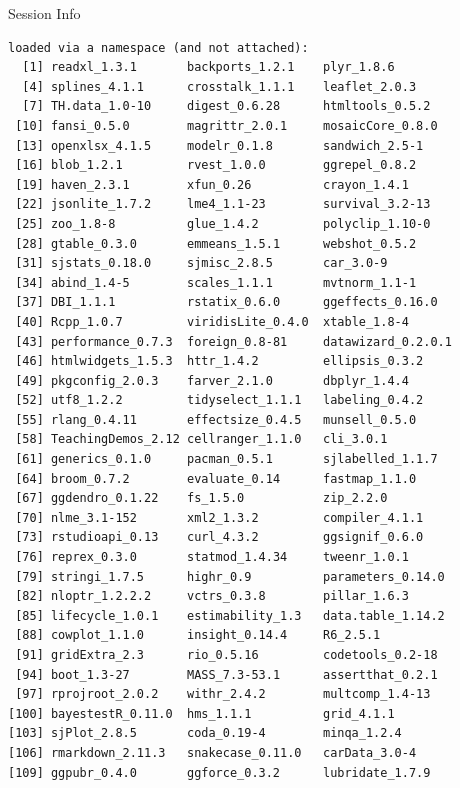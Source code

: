 \documentclass[10pt]{beamer}\usepackage[]{graphicx}\usepackage[]{color}
\makeatletter
\newenvironment{kframe}{%
 \def\at@end@of@kframe{}%
 \ifinner\ifhmode%
  \def\at@end@of@kframe{\end{minipage}}%
  \begin{minipage}{\columnwidth}%
 \fi\fi%
 \def\FrameCommand##1{\hskip\@totalleftmargin \hskip-\fboxsep
 \colorbox{shadecolor}{##1}\hskip-\fboxsep
     \hskip-\linewidth \hskip-\@totalleftmargin \hskip\columnwidth}%
 \MakeFramed {\advance\hsize-\width
   \@totalleftmargin\z@ \linewidth\hsize
   \@setminipage}}%
 {\par\unskip\endMakeFramed%
 \at@end@of@kframe}
\newenvironment{knitrout}{}{} %
\makeatother
\begin{document}
\begin{frame}[fragile]{Session Info}
\begin{knitrout}
\begin{kframe}
\begin{verbatim}
loaded via a namespace (and not attached):
  [1] readxl_1.3.1       backports_1.2.1    plyr_1.8.6        
  [4] splines_4.1.1      crosstalk_1.1.1    leaflet_2.0.3     
  [7] TH.data_1.0-10     digest_0.6.28      htmltools_0.5.2   
 [10] fansi_0.5.0        magrittr_2.0.1     mosaicCore_0.8.0  
 [13] openxlsx_4.1.5     modelr_0.1.8       sandwich_2.5-1    
 [16] blob_1.2.1         rvest_1.0.0        ggrepel_0.8.2     
 [19] haven_2.3.1        xfun_0.26          crayon_1.4.1      
 [22] jsonlite_1.7.2     lme4_1.1-23        survival_3.2-13   
 [25] zoo_1.8-8          glue_1.4.2         polyclip_1.10-0   
 [28] gtable_0.3.0       emmeans_1.5.1      webshot_0.5.2     
 [31] sjstats_0.18.0     sjmisc_2.8.5       car_3.0-9         
 [34] abind_1.4-5        scales_1.1.1       mvtnorm_1.1-1     
 [37] DBI_1.1.1          rstatix_0.6.0      ggeffects_0.16.0  
 [40] Rcpp_1.0.7         viridisLite_0.4.0  xtable_1.8-4      
 [43] performance_0.7.3  foreign_0.8-81     datawizard_0.2.0.1
 [46] htmlwidgets_1.5.3  httr_1.4.2         ellipsis_0.3.2    
 [49] pkgconfig_2.0.3    farver_2.1.0       dbplyr_1.4.4      
 [52] utf8_1.2.2         tidyselect_1.1.1   labeling_0.4.2    
 [55] rlang_0.4.11       effectsize_0.4.5   munsell_0.5.0     
 [58] TeachingDemos_2.12 cellranger_1.1.0   cli_3.0.1         
 [61] generics_0.1.0     pacman_0.5.1       sjlabelled_1.1.7  
 [64] broom_0.7.2        evaluate_0.14      fastmap_1.1.0     
 [67] ggdendro_0.1.22    fs_1.5.0           zip_2.2.0         
 [70] nlme_3.1-152       xml2_1.3.2         compiler_4.1.1    
 [73] rstudioapi_0.13    curl_4.3.2         ggsignif_0.6.0    
 [76] reprex_0.3.0       statmod_1.4.34     tweenr_1.0.1      
 [79] stringi_1.7.5      highr_0.9          parameters_0.14.0 
 [82] nloptr_1.2.2.2     vctrs_0.3.8        pillar_1.6.3      
 [85] lifecycle_1.0.1    estimability_1.3   data.table_1.14.2 
 [88] cowplot_1.1.0      insight_0.14.4     R6_2.5.1          
 [91] gridExtra_2.3      rio_0.5.16         codetools_0.2-18  
 [94] boot_1.3-27        MASS_7.3-53.1      assertthat_0.2.1  
 [97] rprojroot_2.0.2    withr_2.4.2        multcomp_1.4-13   
[100] bayestestR_0.11.0  hms_1.1.1          grid_4.1.1        
[103] sjPlot_2.8.5       coda_0.19-4        minqa_1.2.4       
[106] rmarkdown_2.11.3   snakecase_0.11.0   carData_3.0-4     
[109] ggpubr_0.4.0       ggforce_0.3.2      lubridate_1.7.9   
\end{verbatim}
\end{kframe}
\end{knitrout}
	
\end{frame}
\end{document}

